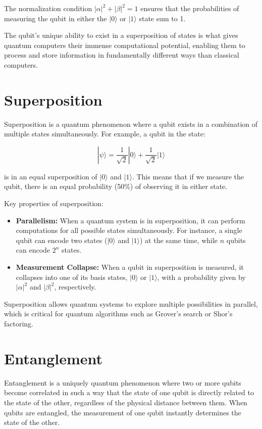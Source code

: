\documentclass[11pt]{article}
\theoremstyle{definition}
\begin{document}
The normalization condition \(|\alpha|^2 + |\beta|^2 = 1\) ensures that the probabilities of measuring the qubit in either the $|0\rangle$ or $|1\rangle$ state sum to 1.

The qubit's unique ability to exist in a superposition of states is what gives quantum computers their immense computational potential, enabling them to process and store information in fundamentally different ways than classical computers.

\section*{Superposition}
Superposition is a quantum phenomenon where a qubit exists in a combination of multiple states simultaneously. For example, a qubit in the state:

\begin{equation}
|\psi\rangle = \frac{1}{\sqrt{2}}|0\rangle + \frac{1}{\sqrt{2}}|1\rangle
\end{equation}

is in an equal superposition of $|0\rangle$ and $|1\rangle$. This means that if we measure the qubit, there is an equal probability (50\%) of observing it in either state.

Key properties of superposition:
\begin{itemize}
    \item \textbf{Parallelism:} When a quantum system is in superposition, it can perform computations for all possible states simultaneously. For instance, a single qubit can encode two states ($|0\rangle$ and $|1\rangle$) at the same time, while $n$ qubits can encode $2^n$ states.
    \item \textbf{Measurement Collapse:} When a qubit in superposition is measured, it collapses into one of its basis states, $|0\rangle$ or $|1\rangle$, with a probability given by $|\alpha|^2$ and $|\beta|^2$, respectively.
\end{itemize}

Superposition allows quantum systems to explore multiple possibilities in parallel, which is critical for quantum algorithms such as Grover's search or Shor's factoring.

\section*{Entanglement}
Entanglement is a uniquely quantum phenomenon where two or more qubits become correlated in such a way that the state of one qubit is directly related to the state of the other, regardless of the physical distance between them. When qubits are entangled, the measurement of one qubit instantly determines the state of the other.
\end{document}
